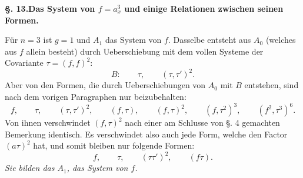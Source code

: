 \documentclass[10pt]{article}
\begin{document}
\begin{center}
{\bfseries §. 13.\quad Das System von $f=a_x^3$ und einige Relationen zwischen seinen\\Formen.}
\end{center}

Für $n=3$ ist $g=1$ und $A_1$ das System von $f$. Dasselbe entsteht aus $A_0$ (welches aus $f$ allein besteht) durch Ueberschiebung mit dem vollen Systeme der Covariante $\tau=(f,f)^2$:
\[
B:
\qquad \tau,
\qquad (\tau,\tau')^2.
\]
Aber von den Formen, die durch Ueberschiebungen von $A_0$ mit $B$ entstehen, sind nach dem vorigen Paragraphen nur beizubehalten:
\[
f,
\qquad \tau,
\qquad (\tau,\tau')^2,
\qquad (f,\tau),
\qquad (f,\tau)^2,
\qquad (f,\tau^2)^3,
\qquad (f^2,\tau^3)^6.
\]
Von ihnen verschwindet $(f,\tau)^2$ nach einer am Schlusse von §. 4 gemachten Bemerkung identisch. Es verschwindet also auch jede Form, welche den Factor $(a\tau)^2$ hat, und somit bleiben nur folgende Formen:
\[
f,
\qquad \tau,
\qquad (\tau\tau')^2,
\qquad (f\tau).
\]
\textit{Sie bilden das $A_1$, das System von $f$.}
\end{document}
